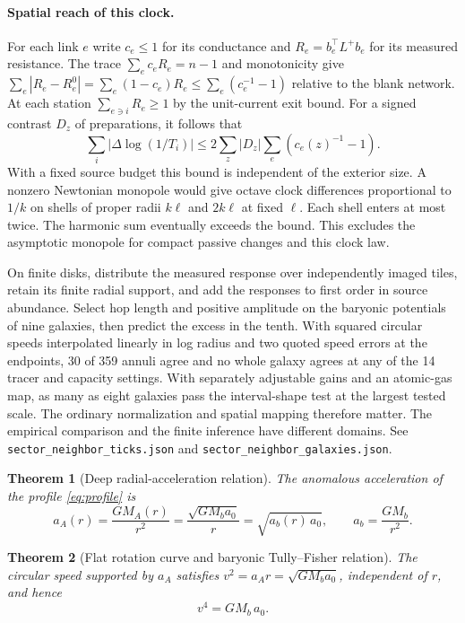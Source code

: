 \documentclass[11pt]{article}
\newtheorem{theorem}{Theorem}[section]
\begin{document}
\paragraph{Spatial reach of this clock.}
For each link \(e\) write \(c_e\le 1\) for its conductance and
\(R_e=b_e^\top L^+b_e\) for its measured resistance. The trace
\(\sum_e c_eR_e=n-1\) and monotonicity give
\(\sum_e|R_e-R_e^0|=\sum_e(1-c_e)R_e
 \le\sum_e(c_e^{-1}-1)\) relative to the blank network.
At each station \(\sum_{e\ni i}R_e\ge1\) by the unit-current exit
bound. For a signed contrast \(D_z\) of preparations, it follows that
\[
  \sum_i|\Delta\log(1/T_i)|
  \le 2\sum_z |D_z|\sum_e(c_e(z)^{-1}-1).
\]
With a fixed source budget this bound is independent of the exterior
size. A nonzero Newtonian monopole would give octave clock differences
proportional to \(1/k\) on shells of proper radii \(k\ell\) and
\(2k\ell\) at fixed \(\ell\). Each shell enters at most twice. The
harmonic sum eventually exceeds the bound. This excludes the
asymptotic monopole for compact passive changes and this clock law.

On finite disks, distribute the measured response over independently
imaged tiles, retain its finite radial support, and add the responses
to first order in source abundance. Select hop length and positive
amplitude on the baryonic potentials of nine galaxies, then predict
the excess in the tenth. With squared circular speeds interpolated
linearly in log radius and two quoted speed errors at the endpoints,
30 of 359 annuli agree and no whole galaxy agrees at any of the 14
tracer and capacity settings. With separately adjustable gains and
an atomic-gas map, as many as eight galaxies pass the interval-shape
test at the largest tested scale. The ordinary normalization and
spatial mapping therefore matter. The empirical comparison and the
finite inference have different domains. See
\texttt{sector\_neighbor\_ticks.json} and
\texttt{sector\_neighbor\_galaxies.json}.

\begin{theorem}[Deep radial-acceleration relation]
\label{thm:rar}
The anomalous acceleration of the profile \eqref{eq:profile} is
\begin{equation}
a_A(r)=\frac{GM_A(r)}{r^2}=\frac{\sqrt{GM_ba_0}}{r}=\sqrt{a_b(r)\,a_0},
\qquad a_b=\frac{GM_b}{r^2}.
\label{eq:deep}
\end{equation}
\end{theorem}

\begin{theorem}[Flat rotation curve and baryonic Tully--Fisher relation]
\label{thm:btfr}
The circular speed supported by \(a_A\) satisfies
\(v^2=a_A r=\sqrt{GM_ba_0}\), independent of \(r\), and hence
\begin{equation}
v^4=GM_b\,a_0 .
\label{eq:btfr}
\end{equation}
\end{theorem}
\end{document}
